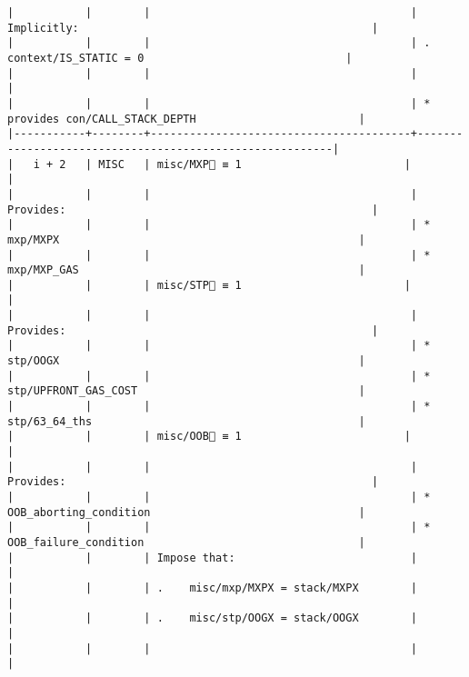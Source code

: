 \documentclass[varwidth=\maxdimen,margin=0.5cm,multi={verbatim}]{standalone}
\begin{document}
\begin{verbatim}
|           |        |                                        | Implicitly:                                             |
|           |        |                                        | .   context/IS_STATIC = 0                               |
|           |        |                                        |                                                         |
|           |        |                                        | * provides con/CALL_STACK_DEPTH                         |
|-----------+--------+----------------------------------------+---------------------------------------------------------|
|   i + 2   | MISC   | misc/MXP🚩 ≡ 1                         |                                                         |
|           |        |                                        | Provides:                                               |
|           |        |                                        | * mxp/MXPX                                              |
|           |        |                                        | * mxp/MXP_GAS                                           |
|           |        | misc/STP🚩 ≡ 1                         |                                                         |
|           |        |                                        | Provides:                                               |
|           |        |                                        | * stp/OOGX                                              |
|           |        |                                        | * stp/UPFRONT_GAS_COST                                  |
|           |        |                                        | * stp/63_64_ths                                         |
|           |        | misc/OOB🚩 ≡ 1                         |                                                         |
|           |        |                                        | Provides:                                               |
|           |        |                                        | * OOB_aborting_condition                                |
|           |        |                                        | * OOB_failure_condition                                 |
|           |        | Impose that:                           |                                                         |
|           |        | .    misc/mxp/MXPX = stack/MXPX        |                                                         |
|           |        | .    misc/stp/OOGX = stack/OOGX        |                                                         |
|           |        |                                        |                                                         |

\end{verbatim}
\end{document}
